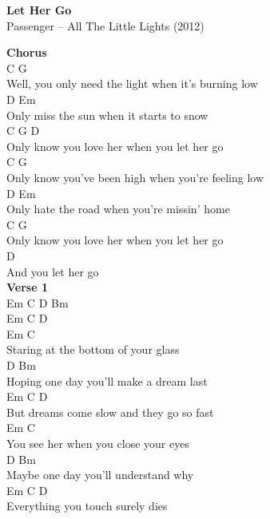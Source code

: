 \documentclass[a4paper]{article}
\begin{document}
    \begin{center}
        \textbf{Let Her Go}
        ~\\
        Passenger -- All The Little Lights (2012)
    \end{center}
    {
        \scriptsize
        \textbf{Chorus}
        ~\\
        {
            \cutive
            \obeyspaces
                        C                           G
\\
Well, you only need the light when it's burning low
\\
              D                       Em
\\
Only miss the sun when it starts to snow
\\
               C                           G       D
\\
Only know you love her when you let her go
\\
                      C                            G
\\
Only know you've been high when you're feeling low
\\
              D                          Em
\\
Only hate the road when you're missin' home
\\
               C                           G
\\
Only know you love her when you let her go
\\
D
\\
  And you let her go
\\

        }
        \textbf{Verse 1}
        ~\\
        {
            \cutive
            \obeyspaces
Em   C   D   Bm
\\
Em   C   D
\\
Em                            C
\\
Staring at the bottom of your glass
\\
        D                          Bm
\\
Hoping one day you'll make a dream last
\\
                  Em              C          D
\\
But dreams come slow and they go so fast
\\
    Em                          C
\\
You see her when you close your eyes
\\
      D                         Bm
\\
Maybe one day you'll understand why
\\
               Em            C        D
\\
Everything you touch surely dies
\\

}}
\end{document}
